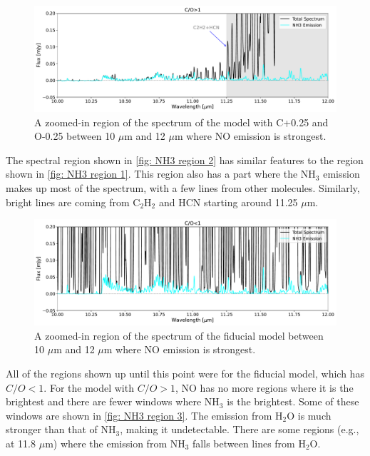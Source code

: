 \documentclass[oneside, single, authoryear, semicolon, 12pt]{lion-msc}
\newcommand{\4}{$_4$}
\newcommand{\3}{$_3$}
\newcommand{\2}{$_2$}
\begin{document}
\begin{figure}[H]
    \centering
    \includegraphics[width=\linewidth]{Figures/NH3_region2.pdf}
    \caption{A zoomed-in region of the spectrum of the model with C+0.25 and O-0.25 between 10 $\mu$m and 12 $\mu$m where NO emission is strongest.}
    \label{fig: NH3 region 2}
\end{figure}

The spectral region shown in \autoref{fig: NH3 region 2} has similar features to the region shown in \autoref{fig: NH3 region 1}. This region also has a part where the NH\3 emission makes up most of the spectrum, with a few lines from other molecules. Similarly, bright lines are coming from C\2H\2 and HCN starting around 11.25 $\mu$m.

\begin{figure}[H]
    \centering
    \includegraphics[width=\linewidth]{Figures/NH3_region3.pdf}
    \caption{A zoomed-in region of the spectrum of the fiducial model between 10 $\mu$m and 12 $\mu$m where NO emission is strongest.}
    \label{fig: NH3 region 3}
\end{figure}

All of the regions shown up until this point were for the fiducial model, which has $C/O<1$. For the model with $C/O>1$, NO has no more regions where it is the brightest and there are fewer windows where NH\3 is the brightest. Some of these windows are shown in \autoref{fig: NH3 region 3}. The emission from H\2O is much stronger than that of NH\3, making it undetectable. There are some regions (e.g., at 11.8 $\mu$m) where the emission from NH\3 falls between lines from H\2O. 
\end{document}
